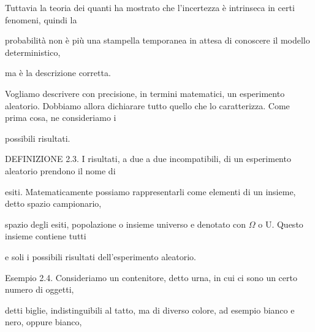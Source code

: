 \documentclass[a4paper,portrait,12pt]{article}
\begin{document}
\begin{flushleft}
Tuttavia la teoria dei quanti ha mostrato che l'incertezza \`{e} intrinseca in certi fenomeni, quindi la
\end{flushleft}


\begin{flushleft}
probabilit\`{a} non \`{e} più una stampella temporanea in attesa di conoscere il modello deterministico,
\end{flushleft}


\begin{flushleft}
ma \`{e} la descrizione corretta.
\end{flushleft}


\begin{flushleft}
Vogliamo descrivere con precisione, in termini matematici, un esperimento aleatorio. Dobbiamo allora dichiarare tutto quello che lo caratterizza. Come prima cosa, ne consideriamo i
\end{flushleft}


\begin{flushleft}
possibili risultati.
\end{flushleft}


\begin{flushleft}
DEFINIZIONE 2.3. I risultati, a due a due incompatibili, di un esperimento aleatorio prendono il nome di
\end{flushleft}


\begin{flushleft}
esiti. Matematicamente possiamo rappresentarli come elementi di un insieme, detto spazio campionario,
\end{flushleft}


\begin{flushleft}
spazio degli esiti, popolazione o insieme universo e denotato con $\Omega$ o U. Questo insieme contiene tutti
\end{flushleft}


\begin{flushleft}
e soli i possibili risultati dell'esperimento aleatorio.
\end{flushleft}


\begin{flushleft}
Esempio 2.4. Consideriamo un contenitore, detto urna, in cui ci sono un certo numero di oggetti,
\end{flushleft}


\begin{flushleft}
detti biglie, indistinguibili al tatto, ma di diverso colore, ad esempio bianco e nero, oppure bianco,
\end{flushleft}
\end{document}
